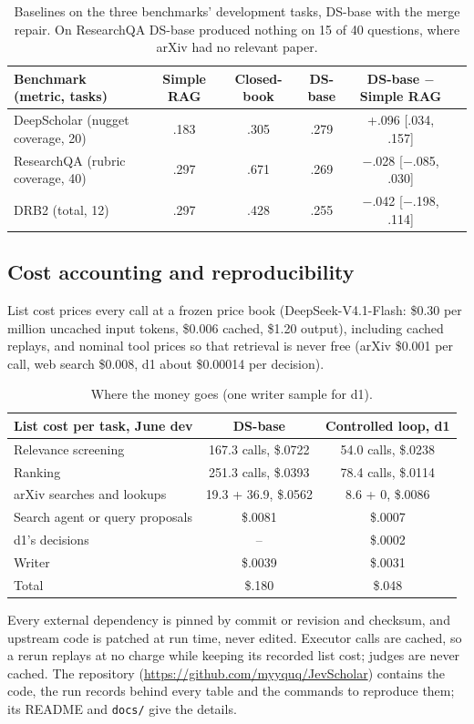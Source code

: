 \documentclass[11pt, letterpaper]{article}
\newcommand{\n}{$-$}
\newcommand{\repo}{\url{https://github.com/myyquq/JevScholar}}
\begin{document}
\begin{table}[H]
\centering\footnotesize\setlength{\tabcolsep}{3pt}
\begin{tabular}{lccccc}
\toprule
Benchmark (metric, tasks) & Simple RAG & Closed-book & DS-base & DS-base $-$ Simple RAG\\
\midrule
DeepScholar (nugget coverage, 20) & .183 & .305 & .279 & +.096 [.034, .157]\\
ResearchQA (rubric coverage, 40) & .297 & .671 & .269 & \n.028 [\n.085, .030]\\
DRB2 (total, 12) & .297 & .428 & .255 & \n.042 [\n.198, .114]\\
\bottomrule
\end{tabular}
\caption{Baselines on the three benchmarks' development tasks, DS-base with the merge repair. On
ResearchQA DS-base produced nothing on 15 of 40 questions, where arXiv had no relevant paper.}
\end{table}

\subsection{Cost accounting and reproducibility}
\label{app:repro}

List cost prices every call at a frozen price book (DeepSeek-V4.1-Flash: \$0.30 per million
uncached input tokens, \$0.006 cached, \$1.20 output), including cached replays, and nominal tool
prices so that retrieval is never free (arXiv \$0.001 per call, web search \$0.008, d1 about
\$0.00014 per decision).

\begin{table}[H]
\centering\footnotesize\setlength{\tabcolsep}{3pt}
\begin{tabular}{lcc}
\toprule
List cost per task, June dev & DS-base & Controlled loop, d1\\
\midrule
Relevance screening & 167.3 calls, \$.0722 & 54.0 calls, \$.0238\\
Ranking & 251.3 calls, \$.0393 & 78.4 calls, \$.0114\\
arXiv searches and lookups & 19.3 + 36.9, \$.0562 & 8.6 + 0, \$.0086\\
Search agent or query proposals & \$.0081 & \$.0007\\
d1's decisions & -- & \$.0002\\
Writer & \$.0039 & \$.0031\\
Total & \$.180 & \$.048\\
\bottomrule
\end{tabular}
\caption{Where the money goes (one writer sample for d1).}
\end{table}

Every external dependency is pinned by commit or revision and checksum, and upstream code is patched
at run time, never edited. Executor calls are cached, so a rerun replays at no charge while keeping
its recorded list cost; judges are never cached. The repository (\repo) contains the code, the run
records behind every table and the commands to reproduce them; its README and \texttt{docs/} give
the details.
\end{document}
